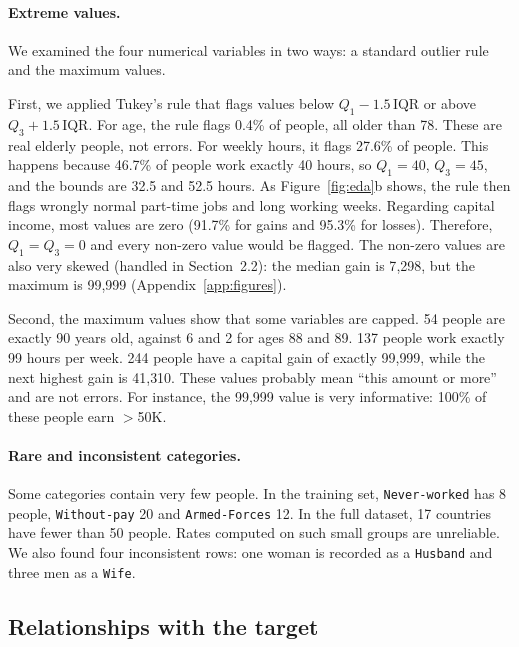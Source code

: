 \documentclass[10pt,a4paper]{article}
\newcommand{\high}{$>$50K}
\begin{document}
\paragraph{Extreme values.}
We examined the four numerical variables in two ways: a standard outlier rule and the
maximum values.

First, we applied Tukey's rule that flags values below $Q_1 - 1.5\,\mathrm{IQR}$ or above
$Q_3 + 1.5\,\mathrm{IQR}$. For age, the rule
flags 0.4\% of people, all older than 78. These are real elderly people, not errors. For
weekly hours, it flags 27.6\% of people. This happens because 46.7\% of people work
exactly 40 hours, so $Q_1 = 40$, $Q_3 = 45$, and the bounds are 32.5 and 52.5 hours. As
Figure~\ref{fig:eda}b shows, the rule then flags wrongly normal part-time jobs and long working
weeks. Regarding capital income, most values are zero (91.7\%
for gains and 95.3\% for losses). Therefore, $Q_1 = Q_3 = 0$ and every non-zero value would be
flagged. The non-zero values are also very skewed (handled in Section~2.2): the median gain is 7{,}298, but the
maximum is 99{,}999 (Appendix~\ref{app:figures}).

Second, the maximum values show that some variables are capped. 54 people are exactly 90
years old, against 6 and 2 for ages 88 and 89. 137 people work exactly 99 hours per week.
244 people have a capital gain of exactly 99{,}999, while the next highest gain is
41{,}310. These values probably mean ``this amount or more'' and are not errors. For instance, the
99{,}999 value is very informative: 100\% of these people earn \high{}.

\paragraph{Rare and inconsistent categories.}
Some categories contain very few people. In the training set, \texttt{Never-worked} has 8
people, \texttt{Without-pay} 20 and \texttt{Armed-Forces} 12. In the full dataset, 17
countries have fewer than 50 people. Rates computed on such small groups are unreliable.
We also found four inconsistent rows: one woman is recorded as a \texttt{Husband} and
three men as a \texttt{Wife}.

\subsection{Relationships with the target}
\end{document}
